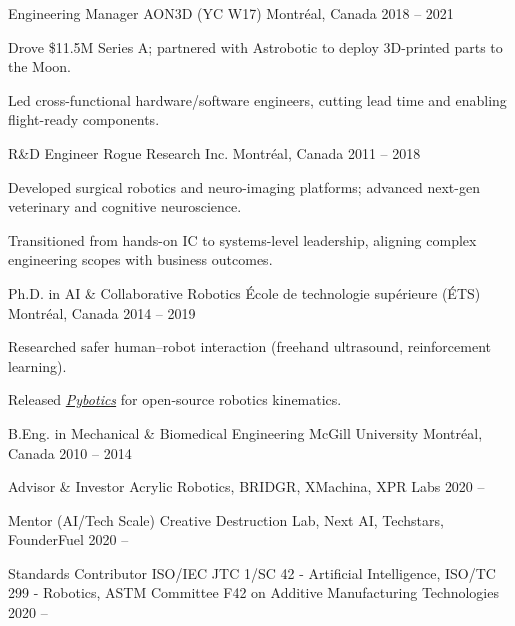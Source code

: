 \documentclass[11pt, letterpaper]{awesome-cv}
\begin{document}
\begin{cventries}
\cventry
{Engineering Manager}
{AON3D (YC W17)}
{Montréal, Canada}
{2018 -- 2021}
{
\begin{cvitems}
\item {Drove \$11.5M Series A; partnered with Astrobotic to deploy 3D-printed parts to the Moon.}
\item {Led cross-functional hardware/software engineers, cutting lead time and enabling flight-ready components.}
\end{cvitems}
}

\cventry
{R\&D Engineer}
{Rogue Research Inc.}
{Montréal, Canada}
{2011 -- 2018}
{
\begin{cvitems}
\item {Developed surgical robotics and neuro-imaging platforms; advanced next-gen veterinary and cognitive neuroscience.}
\item {Transitioned from hands-on IC to systems-level leadership, aligning complex engineering scopes with business outcomes.}
\end{cvitems}
}

\end{cventries}
\begin{cventries}

\cventry
{Ph.D. in AI \& Collaborative Robotics}
{École de technologie supérieure (ÉTS)}
{Montréal, Canada}
{2014 -- 2019}
{
\begin{cvitems}
\item {Researched safer human–robot interaction (freehand ultrasound, reinforcement learning).}
\item {Released \href{https://github.com/EngNadeau/pybotics}{\textit{Pybotics}} for open-source robotics kinematics.}
\end{cvitems}
}

\cventry
{B.Eng. in Mechanical \& Biomedical Engineering}
{McGill University}
{Montréal, Canada}
{2010 -- 2014}
{}

\end{cventries}

\begin{cvhonors}

\cvhonor
{Advisor \& Investor}
{Acrylic Robotics, BRIDGR, XMachina, XPR Labs}
{}
{2020 -- }

\cvhonor
{Mentor (AI/Tech Scale)}
{Creative Destruction Lab, Next AI, Techstars, FounderFuel}
{}
{2020 -- }

\cvhonor
{Standards Contributor}
{ISO/IEC JTC 1/SC 42 - Artificial Intelligence,
ISO/TC 299 - Robotics,
ASTM Committee F42 on Additive Manufacturing Technologies}
{}
{2020 -- }

\end{cvhonors}
\end{document}
